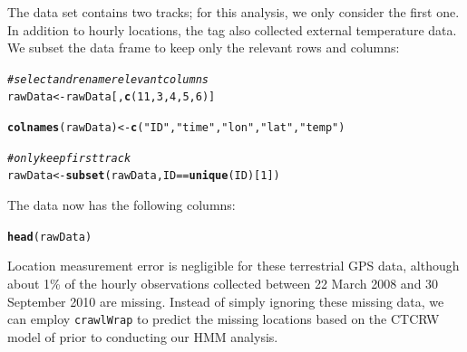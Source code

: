 \documentclass[12pt]{article}\usepackage[]{graphicx}\usepackage[]{xcolor}
\makeatletter
\newcommand{\hlnum}[1]{\textcolor[rgb]{0.686,0.059,0.569}{#1}}%
\newcommand{\hlsng}[1]{\textcolor[rgb]{0.192,0.494,0.8}{#1}}%
\newcommand{\hlcom}[1]{\textcolor[rgb]{0.678,0.584,0.686}{\textit{#1}}}%
\newcommand{\hlopt}[1]{\textcolor[rgb]{0,0,0}{#1}}%
\newcommand{\hldef}[1]{\textcolor[rgb]{0.345,0.345,0.345}{#1}}%
\newcommand{\hlkwb}[1]{\textcolor[rgb]{0.69,0.353,0.396}{#1}}%
\newcommand{\hlkwd}[1]{\textcolor[rgb]{0.737,0.353,0.396}{\textbf{#1}}}%
\newenvironment{kframe}{%
 \def\at@end@of@kframe{}%
 \ifinner\ifhmode%
  \def\at@end@of@kframe{\end{minipage}}%
  \begin{minipage}{\columnwidth}%
 \fi\fi%
 \def\FrameCommand##1{\hskip\@totalleftmargin \hskip-\fboxsep
 \colorbox{shadecolor}{##1}\hskip-\fboxsep
     \hskip-\linewidth \hskip-\@totalleftmargin \hskip\columnwidth}%
 \MakeFramed {\advance\hsize-\width
   \@totalleftmargin\z@ \linewidth\hsize
   \@setminipage}}%
 {\par\unskip\endMakeFramed%
 \at@end@of@kframe}
\newenvironment{knitrout}{}{} %
\makeatother
\begin{document}
The data set contains two tracks; for this analysis, we only consider the first one. In addition to hourly locations, the tag also collected external temperature data. We subset the data frame to keep only the relevant rows and columns:
\begin{knitrout}
\color{fgcolor}\begin{kframe}
\begin{alltt}
\hlcom{# select and rename relevant columns}
\hldef{rawData} \hlkwb{<-} \hldef{rawData[,}\hlkwd{c}\hldef{(}\hlnum{11}\hldef{,}\hlnum{3}\hldef{,}\hlnum{4}\hldef{,}\hlnum{5}\hldef{,}\hlnum{6}\hldef{)]}
\end{alltt}


{\ttfamily\noindent\bfseries\color{errorcolor}{\#\# Error in eval(expr, envir, enclos): object 'rawData' not found}}\begin{alltt}
\hlkwd{colnames}\hldef{(rawData)} \hlkwb{<-} \hlkwd{c}\hldef{(}\hlsng{"ID"}\hldef{,}\hlsng{"time"}\hldef{,}\hlsng{"lon"}\hldef{,}\hlsng{"lat"}\hldef{,}\hlsng{"temp"}\hldef{)}
\end{alltt}


{\ttfamily\noindent\bfseries\color{errorcolor}{\#\# Error: object 'rawData' not found}}\begin{alltt}
\hlcom{# only keep first track}
\hldef{rawData} \hlkwb{<-} \hlkwd{subset}\hldef{(rawData,ID}\hlopt{==}\hlkwd{unique}\hldef{(ID)[}\hlnum{1}\hldef{])}
\end{alltt}


{\ttfamily\noindent\bfseries\color{errorcolor}{\#\# Error in eval(expr, envir, enclos): object 'rawData' not found}}\end{kframe}
\end{knitrout}

The data now has the following columns:
\begin{knitrout}
\color{fgcolor}\begin{kframe}
\begin{alltt}
\hlkwd{head}\hldef{(rawData)}
\end{alltt}


{\ttfamily\noindent\bfseries\color{errorcolor}{\#\# Error in eval(expr, envir, enclos): object 'rawData' not found}}\end{kframe}
\end{knitrout}

Location measurement error is negligible for these terrestrial GPS data, although about 1\% of the hourly observations collected between 22 March 2008 and 30 September 2010 are missing. Instead of simply ignoring these missing data, we can employ \verb|crawlWrap| to predict the missing locations based on the CTCRW model of \cite{JohnsonEtAl2008} prior to conducting our HMM analysis.
\end{document}

